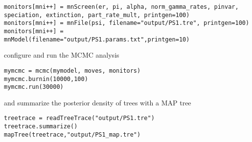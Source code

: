 {\tt \begin{snugshade*}
\begin{lstlisting}
monitors[mni++] = mnScreen(er, pi, alpha, norm_gamma_rates, pinvar, speciation, extinction, part_rate_mult, printgen=100)
monitors[mni++] = mnFile(psi, filename="output/PS1.tre", printgen=100)
monitors[mni++] = mnModel(filename="output/PS1.params.txt",printgen=10)
\end{lstlisting}
\end{snugshade*}}

configure and run the MCMC analysis

{\tt \begin{snugshade*}
\begin{lstlisting}
mymcmc = mcmc(mymodel, moves, monitors)
mymcmc.burnin(10000,100)
mymcmc.run(30000)
\end{lstlisting}
\end{snugshade*}}

and summarize the posterior density of trees with a MAP tree

{\tt \begin{snugshade*}
\begin{lstlisting}
treetrace = readTreeTrace("output/PS1.tre")
treetrace.summarize()
mapTree(treetrace,"output/PS1_map.tre")
\end{lstlisting}
\end{snugshade*}}
